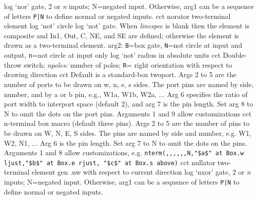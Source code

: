   {log}
  {`nor' gate, 2 or {\sl n\/} inputs; N=negated input.
   Otherwise, arg1 can be a sequence of letters {\tt P|N}
   to define normal or negated inputs.
    }
  {cct}
  { norator two-terminal element }
  {log}
  {`not' circle}
  {log}
  {`not' gate.
   When {\sl linespec} is blank then the element is composite and In1,
   Out, C, NE, and SE are defined; otherwise the element is drawn as
   a two-terminal element. arg2: {\tt B}=box gate, {\tt N}=not circle at input
   and output, {\tt n}=not circle at input only 
    }
  {log}
  {`not' radius in absolute units}
  {cct}
  {Double-throw switch; {\sl npoles:} number of poles;
   {\tt R}= right orientation with respect to drawing direction
   }
  {cct}
  { Default is a standard-box twoport.  Args 2 to 5 are
    the number of ports to be drawn on w, n, e, s sides.
    The port pins are named by side, number, and by a or b pin,
    e.g., W1a, W1b, W2a, $\ldots$
    Arg 6 specifies the ratio of port width to interport space (default 2),
    and arg 7 is the pin length.  Set arg 8 to N to omit the dots on
    the port pins. Arguments 1 and 9 allow customizations
   }
  {cct}
  {n-terminal box macro (default three pins).
   Args 2 to 5 are the number of pins to be drawn on W, N, E, S sides.
   The pins are named by side and number, e.g. W1, W2, N1, $\ldots$
   Arg 6 is the pin length.  Set arg 7 to N to omit the dots
   on the pins. Arguments 1 and 8 allow customizations, e.g.
   {\tt nterm(,{,},{,},{,}N,"\$a\$" at Box.w ljust,"\$b\$" at Box.e rjust,
      "\$c\$" at Box.s above)} }
  {cct}
  { nullator two-terminal element }
  {gen}
  {.nw with respect to current direction}
  {log}
  {`nxor' gate, 2 or {\sl n\/} inputs; N=negated input.
   Otherwise, arg1 can be a sequence of letters {\tt P|N}
   to define normal or negated inputs.
    }
%

